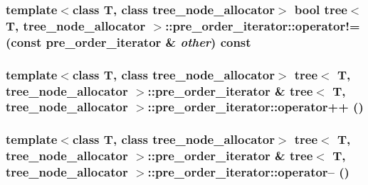 \hypertarget{classtree_1_1pre__order__iterator_14425c7743e9a6da2d96b172a85d2bed}{
\subsubsection{\setlength{\rightskip}{0pt plus 5cm}template$<$class T, class tree\_\-node\_\-allocator$>$ bool {\bf tree}$<$ T, tree\_\-node\_\-allocator $>$::pre\_\-order\_\-iterator::operator!= (const {\bf pre\_\-order\_\-iterator} \& {\em other}) const}}
\label{classtree_1_1pre__order__iterator_14425c7743e9a6da2d96b172a85d2bed}


\hypertarget{classtree_1_1pre__order__iterator_07b77d1591ad7f05e4531489561d36d2}{
\subsubsection{\setlength{\rightskip}{0pt plus 5cm}template$<$class T, class tree\_\-node\_\-allocator$>$ {\bf tree}$<$ T, tree\_\-node\_\-allocator $>$::{\bf pre\_\-order\_\-iterator} \& {\bf tree}$<$ T, tree\_\-node\_\-allocator $>$::pre\_\-order\_\-iterator::operator++ ()}}
\label{classtree_1_1pre__order__iterator_07b77d1591ad7f05e4531489561d36d2}


\hypertarget{classtree_1_1pre__order__iterator_4e2dd21653724b6413d9949caf9bb107}{
\subsubsection{\setlength{\rightskip}{0pt plus 5cm}template$<$class T, class tree\_\-node\_\-allocator$>$ {\bf tree}$<$ T, tree\_\-node\_\-allocator $>$::{\bf pre\_\-order\_\-iterator} \& {\bf tree}$<$ T, tree\_\-node\_\-allocator $>$::pre\_\-order\_\-iterator::operator-- ()}}
\label{classtree_1_1pre__order__iterator_4e2dd21653724b6413d9949caf9bb107}



